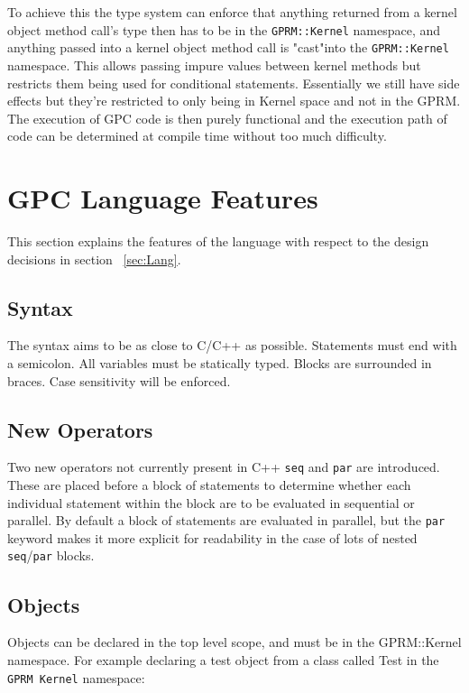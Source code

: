 To achieve this the type system can enforce that anything returned from a kernel object method call's type then has to be in the 
\texttt{GPRM::Kernel} namespace, and anything passed into a kernel object method call is "cast"into the \texttt{GPRM::Kernel}
namespace. This allows passing impure values between kernel methods but restricts them being used
for conditional statements. Essentially we still have side effects but they're restricted to
only being in Kernel space and not in the GPRM. The execution of GPC code is then purely functional
and the execution path of code can be determined at compile time without too much difficulty.

\section{GPC Language Features}

    This section explains the features of the language with respect to the design decisions in section ~\ref{sec:Lang}.

\subsection{Syntax}
        The syntax aims to be as close to C/C++ as possible. Statements must end with a semicolon. 
        All variables must be statically typed. Blocks are surrounded in braces. Case sensitivity
        will be enforced.

\subsection{New Operators}
        Two new operators not currently present in C++ \texttt{seq} and \texttt{par} are introduced. 
        These are placed before a block
        of statements to determine whether each individual statement within the block are
        to be evaluated in sequential or parallel. By default a block of statements are evaluated
        in parallel, but the \texttt{par} keyword makes it more explicit for readability in the case of lots of nested
        \texttt{seq}/\texttt{par} blocks.

\subsection{Objects}
Objects can be declared in the top level scope, and must be in the GPRM::Kernel namespace.
For example declaring a test object from a class called Test in the \texttt{GPRM Kernel} namespace:

